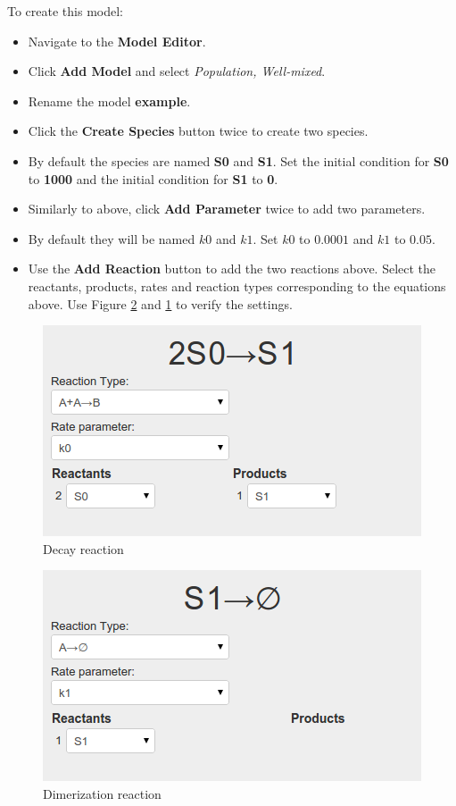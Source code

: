 To create this model:
\begin{itemize}
  \item Navigate to the \textbf{Model Editor}.
  \item Click \textbf{Add Model} and select \textit{Population, Well-mixed}.
  \item Rename the model \textbf{example}.
  \item Click the \textbf{Create Species} button twice to create two species.
  \item By default the species are named \textbf{S0} and \textbf{S1}. Set the initial condition for \textbf{S0} to \textbf{1000} and the initial condition for \textbf{S1} to \textbf{0}.
  \item Similarly to above, click \textbf{Add Parameter} twice to add two parameters.
  \item By default they will be named $k0$ and $k1$. Set $k0$ to $0.0001$ and $k1$ to $0.05$.
  \item Use the \textbf{Add Reaction} button to add the two reactions above. Select the reactants, products, rates and reaction types corresponding to the equations above. Use Figure \ref{fig:reaction1} and \ref{fig:reaction2} to verify the settings.
\end{itemize}

\begin{figure}[!htb]
\centering
\includegraphics[scale=0.64]{T1/reaction2.png}
\caption{Decay reaction}
\label{fig:reaction2}
\end{figure}

\begin{figure}[!htb]
\centering
\includegraphics[scale=0.64]{T1/reaction1.png}
\caption{Dimerization reaction}
\label{fig:reaction1}
\end{figure}

